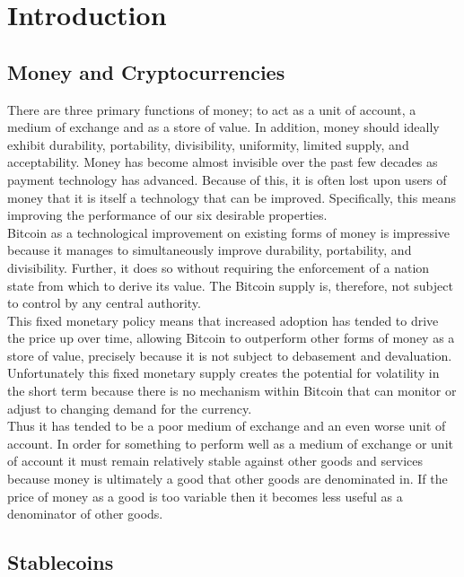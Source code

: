 \section{Introduction}

\subsection{Money and Cryptocurrencies}

There are three primary functions of money; to act as a unit of account, a medium of exchange
and as a store of value. In addition, money should ideally exhibit durability,
portability, divisibility, uniformity, limited supply, and acceptability.
Money has become almost invisible over the past few decades as payment technology has advanced.
Because of this, it is often lost upon users of money that it is itself a technology that can be
improved. Specifically, this means improving the performance of our six desirable properties. \\

\noindent Bitcoin as a technological improvement on existing forms of money is impressive because it manages to simultaneously improve durability, portability, and divisibility.
Further, it does so without requiring the enforcement of a nation state from which to derive its value.
The Bitcoin supply is, therefore, not subject to control by any central authority. \\

\noindent This fixed monetary policy means that increased adoption has tended to drive the price up over time,
allowing Bitcoin to outperform other forms of money as a store of value, precisely because it is not
subject to debasement and devaluation. Unfortunately this fixed monetary supply creates the potential
for volatility in the short term because there is no mechanism within Bitcoin that can monitor or
adjust to changing demand for the currency. \\

\noindent Thus it has tended to be a poor medium of exchange and an even worse unit of account.
In order for something to perform well as a medium of exchange or unit of account it must remain
relatively stable against other goods and services because money is ultimately a good that other goods
are denominated in. If the price of money as a good is too variable then it becomes less useful as a
denominator of other goods.

\subsection{Stablecoins}


